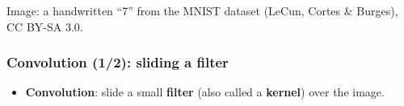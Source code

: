 \documentclass[10pt]{beamer}
\begin{document}
\begin{frame}[fragile]
\vspace{-2pt}
{\fontsize{6}{6}\selectfont Image: a handwritten ``7'' from the MNIST dataset (LeCun, Cortes \& Burges), CC BY-SA 3.0.\par}

\end{frame}
\begin{frame}[fragile]
\frametitle{Convolution (1/2): sliding a filter}

\begin{itemize}
\item \textbf{Convolution}: slide a small \textbf{filter} (also called a
  \textbf{kernel}) over the image. 
\end{itemize}


\end{frame}
\end{document}
